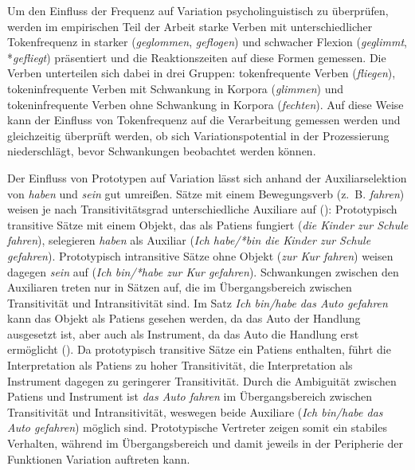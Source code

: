 Um den Einfluss der Frequenz auf Variation psycholinguistisch zu überprüfen, werden im empirischen Teil der Arbeit starke Verben mit unterschiedlicher Tokenfrequenz in starker (\textit{geglommen}, \textit{geflogen}) und schwacher Flexion (\textit{geglimmt}, *\textit{gefliegt}) präsentiert und die Reaktionszeiten auf diese Formen gemessen. Die Verben unterteilen sich dabei in drei Gruppen: tokenfrequente Verben (\textit{fliegen}), tokeninfrequente Verben mit Schwankung in Korpora (\textit{glimmen}) und tokeninfrequente Verben ohne Schwankung in Korpora (\textit{fechten}). Auf diese Weise kann der Einfluss von Tokenfrequenz auf die Verarbeitung gemessen werden und gleichzeitig überprüft werden, ob sich Variationspotential in der Prozessierung niederschlägt, bevor Schwankungen beobachtet werden können.

Der Einfluss von Prototypen auf Variation lässt sich anhand der Auxiliarselektion von \textit{haben} und \textit{sein} gut umreißen. Sätze mit einem Bewegungsverb (z.~B. \textit{fahren}) weisen je nach Transitivitätsgrad unterschiedliche Auxiliare auf (\cite[316--319]{Gillmann.2016}): Prototypisch transitive Sätze mit einem Objekt, das als Patiens fungiert (\textit{die Kinder zur Schule fahren}), selegieren \textit{haben} als Auxiliar (\textit{Ich habe/*bin die Kinder zur Schule gefahren}). Prototypisch intransitive Sätze ohne Objekt (\textit{zur Kur fahren}) weisen dagegen \textit{sein} auf (\textit{Ich bin/*habe zur Kur gefahren}). Schwankungen zwischen den Auxiliaren treten nur in Sätzen auf, die im Übergangsbereich zwischen Transitivität und Intransitivität sind. Im Satz \textit{Ich bin/habe das Auto gefahren} kann das Objekt als Patiens gesehen werden, da das Auto der Handlung ausgesetzt ist, aber auch als Instrument, da das Auto die Handlung erst ermöglicht (\cite[251]{Gillmann.2016}). Da prototypisch transitive Sätze ein Patiens enthalten, führt die Interpretation als Patiens zu hoher Transitivität, die Interpretation als Instrument dagegen zu geringerer Transitivität. Durch die Ambiguität zwischen Patiens und Instrument ist \textit{das Auto fahren} im Übergangsbereich zwischen Transitivität und Intransitivität, weswegen beide Auxiliare (\textit{Ich bin/habe das Auto gefahren}) möglich sind. Prototypische Vertreter zeigen somit ein stabiles Verhalten, während im Übergangsbereich und damit jeweils in der Peripherie der Funktionen Variation auftreten kann.

